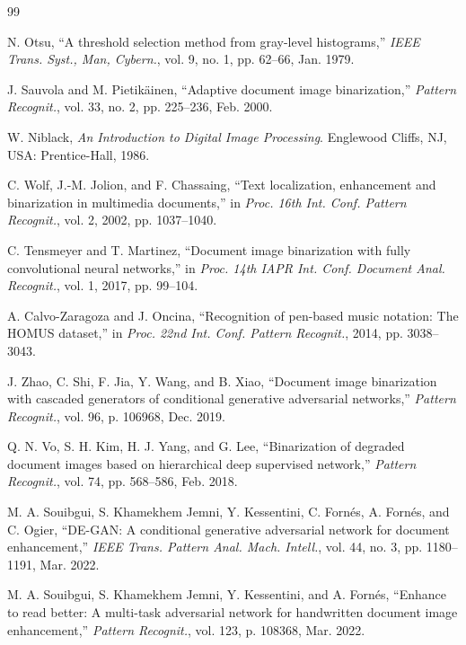 \documentclass[journal]{IEEEtran}
\begin{document}
\begin{thebibliography}{99}

N. Otsu, ``A threshold selection method from gray-level histograms,'' \textit{IEEE Trans. Syst., Man, Cybern.}, vol. 9, no. 1, pp. 62--66, Jan. 1979.

J. Sauvola and M. Pietikäinen, ``Adaptive document image binarization,'' \textit{Pattern Recognit.}, vol. 33, no. 2, pp. 225--236, Feb. 2000.

W. Niblack, \textit{An Introduction to Digital Image Processing}. Englewood Cliffs, NJ, USA: Prentice-Hall, 1986.

C. Wolf, J.-M. Jolion, and F. Chassaing, ``Text localization, enhancement and binarization in multimedia documents,'' in \textit{Proc. 16th Int. Conf. Pattern Recognit.}, vol. 2, 2002, pp. 1037--1040.

C. Tensmeyer and T. Martinez, ``Document image binarization with fully convolutional neural networks,'' in \textit{Proc. 14th IAPR Int. Conf. Document Anal. Recognit.}, vol. 1, 2017, pp. 99--104.

A. Calvo-Zaragoza and J. Oncina, ``Recognition of pen-based music notation: The HOMUS dataset,'' in \textit{Proc. 22nd Int. Conf. Pattern Recognit.}, 2014, pp. 3038--3043.

J. Zhao, C. Shi, F. Jia, Y. Wang, and B. Xiao, ``Document image binarization with cascaded generators of conditional generative adversarial networks,'' \textit{Pattern Recognit.}, vol. 96, p. 106968, Dec. 2019.

Q. N. Vo, S. H. Kim, H. J. Yang, and G. Lee, ``Binarization of degraded document images based on hierarchical deep supervised network,'' \textit{Pattern Recognit.}, vol. 74, pp. 568--586, Feb. 2018.

M. A. Souibgui, S. Khamekhem Jemni, Y. Kessentini, C. Fornés, A. Fornés, and C. Ogier, ``DE-GAN: A conditional generative adversarial network for document enhancement,'' \textit{IEEE Trans. Pattern Anal. Mach. Intell.}, vol. 44, no. 3, pp. 1180--1191, Mar. 2022.

M. A. Souibgui, S. Khamekhem Jemni, Y. Kessentini, and A. Fornés, ``Enhance to read better: A multi-task adversarial network for handwritten document image enhancement,'' \textit{Pattern Recognit.}, vol. 123, p. 108368, Mar. 2022.


\end{thebibliography}
\end{document}
